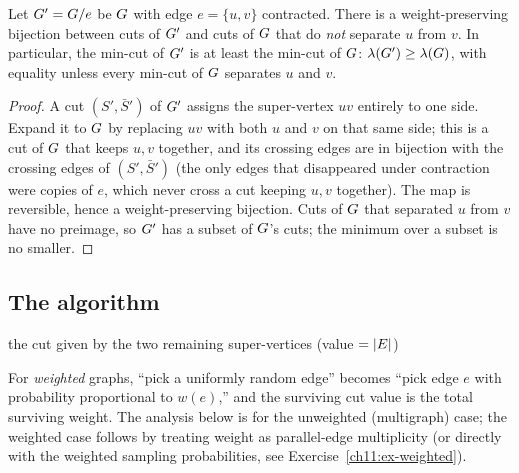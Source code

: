 \begin{lemma}\label{ch11:lem-contract}
Let $G'=G/e$ be $G$ with edge $e=\{u,v\}$ contracted. There is a weight-preserving bijection between cuts of $G'$ and cuts of $G$ that do \emph{not} separate $u$ from $v$. In particular, the min-cut of $G'$ is at least the min-cut of $G$: $\lambda(G')\ge\lambda(G)$, with equality unless every min-cut of $G$ separates $u$ and $v$.
\end{lemma}

\begin{proof}
A cut $(S',\bar S')$ of $G'$ assigns the super-vertex $uv$ entirely to one side. Expand it to $G$ by replacing $uv$ with both $u$ and $v$ on that same side; this is a cut of $G$ that keeps $u,v$ together, and its crossing edges are in bijection with the crossing edges of $(S',\bar S')$ (the only edges that disappeared under contraction were copies of $e$, which never cross a cut keeping $u,v$ together). The map is reversible, hence a weight-preserving bijection. Cuts of $G$ that separated $u$ from $v$ have no preimage, so $G'$ has a subset of $G$'s cuts; the minimum over a subset is no smaller.
\end{proof}

\subsection{The algorithm}

\begin{algorithm}[H]
\caption{\textsc{KargerContract}$(\Gph)$ --- one trial (unweighted multigraph)}
\label{ch11:alg-karger}
\DontPrintSemicolon
{}
\Return the cut given by the two remaining super-vertices (value $=\lvert E\rvert$)\;
\end{algorithm}

For \emph{weighted} graphs, ``pick a uniformly random edge'' becomes ``pick edge $e$ with probability proportional to $w(e)$,'' and the surviving cut value is the total surviving weight. The analysis below is for the unweighted (multigraph) case; the weighted case follows by treating weight as parallel-edge multiplicity (or directly with the weighted sampling probabilities, see Exercise~\ref{ch11:ex-weighted}).

